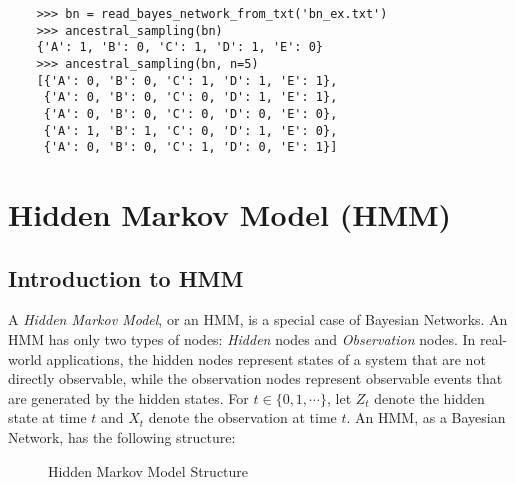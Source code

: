 \documentclass{article}
\theoremstyle{definition}
\begin{document}
\begin{verbatim}
    >>> bn = read_bayes_network_from_txt('bn_ex.txt')
    >>> ancestral_sampling(bn)
    {'A': 1, 'B': 0, 'C': 1, 'D': 1, 'E': 0}
    >>> ancestral_sampling(bn, n=5)
    [{'A': 0, 'B': 0, 'C': 1, 'D': 1, 'E': 1},
     {'A': 0, 'B': 0, 'C': 0, 'D': 1, 'E': 1},
     {'A': 0, 'B': 0, 'C': 0, 'D': 0, 'E': 0},
     {'A': 1, 'B': 1, 'C': 0, 'D': 1, 'E': 0},
     {'A': 0, 'B': 0, 'C': 1, 'D': 0, 'E': 1}]
\end{verbatim}

\pagebreak

\section{Hidden Markov Model (HMM)}

\subsection{Introduction to HMM}

A \textit{Hidden Markov Model}, or an HMM, is a special case of Bayesian Networks. An HMM has only two types of nodes: \textit{Hidden} nodes and \textit{Observation} nodes. In real-world applications, the hidden nodes represent states of a system that are not directly observable, while the observation nodes represent observable events that are generated by the hidden states. For \(t\in \{0, 1, \cdots\}\), let \(Z_t\) denote the hidden state at time \(t\) and \(X_t\) denote the observation at time \(t\). An HMM, as a Bayesian Network, has the following structure:

\begin{figure}[htbp]
    \centering
    \caption{Hidden Markov Model Structure}
    \label{fig:hmm_structure}
\end{figure}
\end{document}

